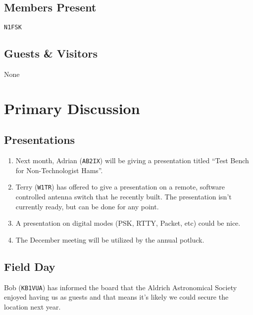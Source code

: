 \documentclass[10pt,letterpaper]{article}
\begin{document}
\subsection{Members Present}

\texttt{N1FSK}

\subsection{Guests \& Visitors}

None

\section{Primary Discussion}

\subsection{Presentations}
\begin{enumerate}
  \item Next month, Adrian (\texttt{AB2IX}) will be giving a presentation titled ``Test Bench for Non-Technologist Hams''.
  \item Terry (\texttt{W1TR}) has offered to give a presentation on a remote, software controlled antenna switch that he recently built. The presentation isn't currently ready, but can be done for any point.
  \item A presentation on digital modes (PSK, RTTY, Packet, etc) could be nice.
  \item The December meeting will be utilized by the annual potluck.
\end{enumerate}

\subsection{Field Day}
Bob (\texttt{KB1VUA}) has informed the board that the Aldrich Astronomical Society enjoyed having us as guests and that means it's likely we could secure the location next year.
\end{document}
